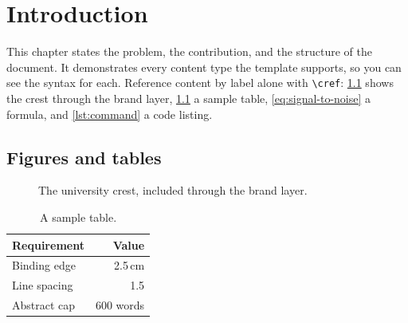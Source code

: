 \chapter{Introduction}
This chapter states the problem, the contribution, and the structure of the document. It demonstrates every content type the template supports, so you can see the syntax for each. Reference content by label alone with \texttt{\textbackslash cref}: \cref{fig:crest} shows the crest through the brand layer, \cref{tab:regulation} a sample table, \cref{eq:signal-to-noise} a formula, and \cref{lst:command} a code listing.

\section{Figures and tables}
\begin{figure}[htbp]
  \centering
  \bangorcrest[4cm]
  \caption{The university crest, included through the brand layer.}
  \label{fig:crest}
\end{figure}

\begin{table}[htbp]
  \centering
  \caption{A sample table.}
  \label{tab:regulation}
  \begin{tabular}{lr}
    \hline
    Requirement & Value \\
    \hline
    Binding edge & 2.5\,cm \\
    Line spacing & 1.5 \\
    Abstract cap & 600 words \\
    \hline
  \end{tabular}
\end{table}
